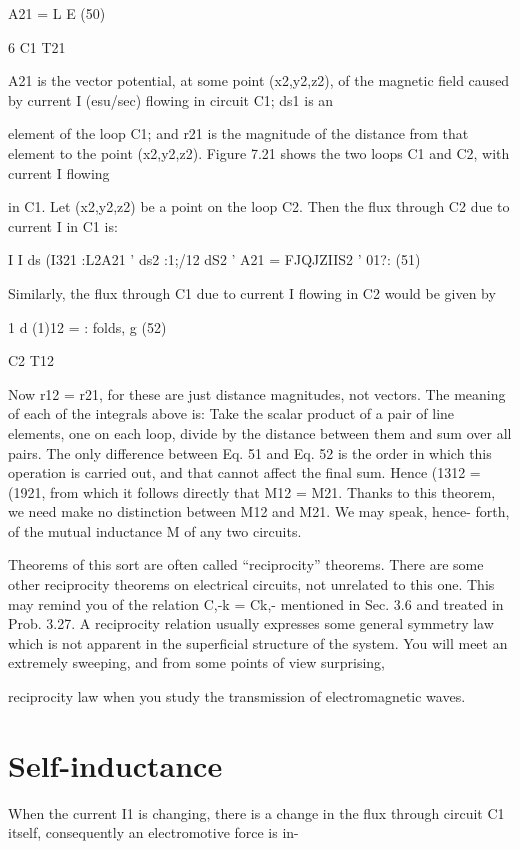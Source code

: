 \begin{equation}
\end{equation}
A21 = L E (50)

6 C1 T21

A21 is the vector potential, at some point (x2,y2,z2), of the magnetic
field caused by current I (esu/sec) flowing in circuit C1; ds1 is an

element of the loop C1; and r21 is the magnitude of the distance from
that element to the point (x2,y2,z2).
Figure 7.21 shows the two loops C1 and C2, with current I flowing

in C1. Let (x2,y2,z2) be a point on the loop C2. Then the flux
through C2 due to current I in C1 is:

\begin{equation}
\end{equation}
I I ds
(I321 :L2A21 ' ds2 :1;/12 dS2 ' A21 = FJQJZIIS2 ' 01?: (51)

Similarly, the flux through C1 due to current I flowing in C2 would
be given by

\begin{equation}
\end{equation}
1 d
(1)12 = : folds, g (52)

C2 T12

Now r12 = r21, for these are just distance magnitudes, not vectors.
The meaning of each of the integrals above is: Take the scalar product
of a pair of line elements, one on each loop, divide by the distance
between them and sum over all pairs. The only difference between
Eq. 51 and Eq. 52 is the order in which this operation is carried out,
and that cannot affect the final sum. Hence (1312 = (1921, from which
it follows directly that M12 = M21. Thanks to this theorem, we need
make no distinction between M12 and M21. We may speak, hence-
forth, of the mutual inductance M of any two circuits.

Theorems of this sort are often called ``reciprocity'' theorems.
There are some other reciprocity theorems on electrical circuits, not
unrelated to this one. This may remind you of the relation C,-k = Ck,-
mentioned in Sec. 3.6 and treated in Prob. 3.27. A reciprocity relation
usually expresses some general symmetry law which is not apparent
in the superficial structure of the system. You will meet an
extremely sweeping, and from some points of view surprising,

reciprocity law when you study the transmission of electromagnetic
waves.

\section{Self-inductance}
When the current I1 is changing, there is a change in the flux
through circuit C1 itself, consequently an electromotive force is in-

